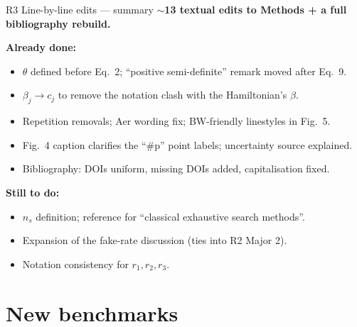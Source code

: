 \documentclass[aspectratio=169]{beamer}
\begin{document}
\begin{frame}{R3 Line-by-line edits --- summary}
\textbf{$\sim$13 textual edits to Methods + a full bibliography rebuild.}
\smallskip

\textbf{Already done:}
\begin{itemize}\footnotesize
  \item $\theta$ defined before Eq.\ 2; ``positive semi-definite'' remark moved after Eq.\ 9.
  \item $\beta_j \to c_j$ to remove the notation clash with the Hamiltonian's $\beta$.
  \item Repetition removals; Aer wording fix; BW-friendly linestyles in Fig.\ 5.
  \item Fig.\ 4 caption clarifies the ``\#p'' point labels; uncertainty source explained.
  \item Bibliography: DOIs uniform, missing DOIs added, capitalisation fixed.
\end{itemize}
\smallskip

\textbf{Still to do:}
\begin{itemize}\footnotesize
  \item $n_s$ definition; reference for ``classical exhaustive search methods''.
  \item Expansion of the fake-rate discussion (ties into R2 Major 2).
  \item Notation consistency for $r_1, r_2, r_3$.
\end{itemize}
\end{frame}

\section{New benchmarks}
\end{document}
